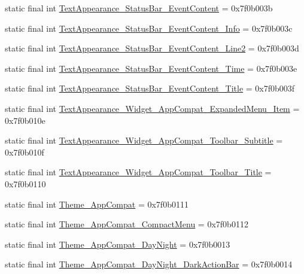 \begin{CompactItemize}
\item 
static final int \hyperlink{classandroid_1_1support_1_1v7_1_1recyclerview_1_1_r_1_1style_1da2084b5ccc5e536f696d03e57125fa}{TextAppearance\_\-StatusBar\_\-EventContent} = 0x7f0b003b
\item 
static final int \hyperlink{classandroid_1_1support_1_1v7_1_1recyclerview_1_1_r_1_1style_266a8124c4c32fbceab26e062042be83}{TextAppearance\_\-StatusBar\_\-EventContent\_\-Info} = 0x7f0b003c
\item 
static final int \hyperlink{classandroid_1_1support_1_1v7_1_1recyclerview_1_1_r_1_1style_4471d418c5c01bdf8461ed6cc143d48a}{TextAppearance\_\-StatusBar\_\-EventContent\_\-Line2} = 0x7f0b003d
\item 
static final int \hyperlink{classandroid_1_1support_1_1v7_1_1recyclerview_1_1_r_1_1style_eeb99cb288741cae28df3de4799eee2a}{TextAppearance\_\-StatusBar\_\-EventContent\_\-Time} = 0x7f0b003e
\item 
static final int \hyperlink{classandroid_1_1support_1_1v7_1_1recyclerview_1_1_r_1_1style_d5f7e819d27a67bab83722e1ae4c560e}{TextAppearance\_\-StatusBar\_\-EventContent\_\-Title} = 0x7f0b003f
\item 
static final int \hyperlink{classandroid_1_1support_1_1v7_1_1recyclerview_1_1_r_1_1style_20b9da4e6829f7cb739fea3e8251d354}{TextAppearance\_\-Widget\_\-AppCompat\_\-ExpandedMenu\_\-Item} = 0x7f0b010e
\item 
static final int \hyperlink{classandroid_1_1support_1_1v7_1_1recyclerview_1_1_r_1_1style_5ee5948cbc74fc162aa71fc9d789640a}{TextAppearance\_\-Widget\_\-AppCompat\_\-Toolbar\_\-Subtitle} = 0x7f0b010f
\item 
static final int \hyperlink{classandroid_1_1support_1_1v7_1_1recyclerview_1_1_r_1_1style_2daa7b4e25bf065a4ac10e84cfab4bbe}{TextAppearance\_\-Widget\_\-AppCompat\_\-Toolbar\_\-Title} = 0x7f0b0110
\item 
static final int \hyperlink{classandroid_1_1support_1_1v7_1_1recyclerview_1_1_r_1_1style_5589d291dce43f044515d062d56c52ab}{Theme\_\-AppCompat} = 0x7f0b0111
\item 
static final int \hyperlink{classandroid_1_1support_1_1v7_1_1recyclerview_1_1_r_1_1style_b0324beda682f5b33137d2aa88d5313a}{Theme\_\-AppCompat\_\-CompactMenu} = 0x7f0b0112
\item 
static final int \hyperlink{classandroid_1_1support_1_1v7_1_1recyclerview_1_1_r_1_1style_824be2f0a2cbdc247746dfc383aa42c8}{Theme\_\-AppCompat\_\-DayNight} = 0x7f0b0013
\item 
static final int \hyperlink{classandroid_1_1support_1_1v7_1_1recyclerview_1_1_r_1_1style_e22124d5681a6996be04eb047f77a31f}{Theme\_\-AppCompat\_\-DayNight\_\-DarkActionBar} = 0x7f0b0014

\end{CompactItemize}
